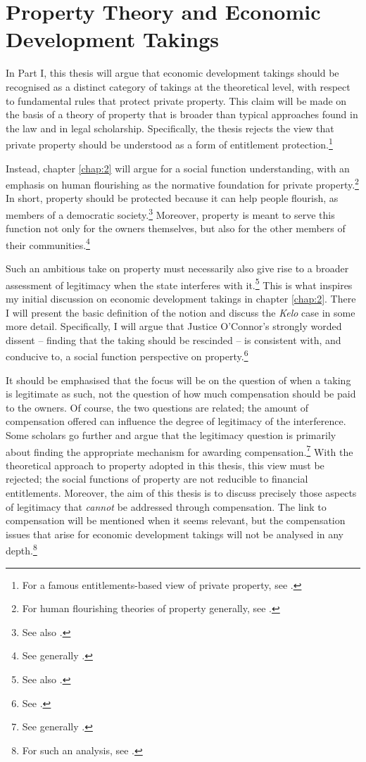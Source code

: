 \section{Property Theory and Economic Development Takings}\label{sec:1:1}

In Part I, this thesis will argue that economic development takings should be recognised as a distinct category of takings at the theoretical level, with respect to fundamental rules that protect private property. This claim will be made on the basis of a theory of property that is broader than typical approaches found in the law and in legal scholarship. Specifically, the thesis rejects the view that private property should be understood as a form of entitlement protection.\footnote{For a famous entitlements-based view of private property, see \cite{calabresi72}.}

Instead, chapter \ref{chap:2} will argue for a social function understanding, with an emphasis on human flourishing as the normative foundation for private property.\footnote{For human flourishing theories of property generally, see \cite[chapter 5]{alexander10}.} In short, property should be protected because it can help people flourish, as members of a democratic society.\footnote{See also \cite[1089]{crawford11}.} Moreover, property is meant to serve this function not only for the owners themselves, but also for the other members of their communities.\footnote{See generally \cite{gray94,alexander09d,alexander14}.}

Such an ambitious take on property must necessarily also give rise to a broader assessment of legitimacy when the state interferes with it.\footnote{See also \cite{underkuffler06}.} This is what inspires my initial discussion on economic development takings in chapter \ref{chap:2}. There I will present the basic definition of the notion and discuss the {\it Kelo} case in some more detail. Specifically, I will argue that Justice O'Connor's strongly worded dissent -- finding that the taking should be rescinded -- is consistent with, and conducive to, a social function perspective on property.\footnote{See \cite[494-505]{kelo05}.}

It should be emphasised that the focus will be on the question of when a taking is legitimate as such, not the question of how much compensation should be paid to the owners. Of course, the two questions are related; the amount of compensation offered can influence the degree of legitimacy of the interference. Some scholars go further and argue that the legitimacy question is primarily about finding the appropriate mechanism for awarding compensation.\footnote{See generally \cite{fennell04,bell07,lehavi07}.} With the theoretical approach to property adopted in this thesis, this view must be rejected; the social functions of property are not reducible to financial entitlements. Moreover, the aim of this thesis is to discuss precisely those aspects of legitimacy that {\it cannot} be addressed through compensation. The link to compensation will be mentioned when it seems relevant, but the compensation issues that arise for economic development takings will not be analysed in any depth.\footnote{For such an analysis, see \cite{dyrkolbotn15a}.}

